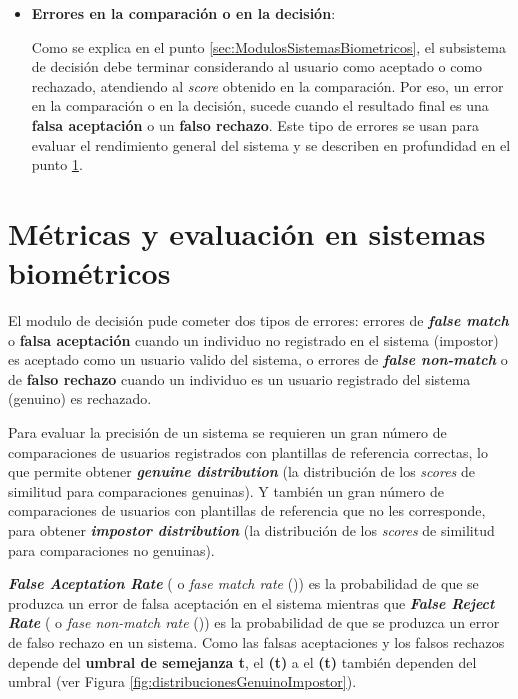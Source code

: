 \begin{itemize}
    \item 
    \textbf{Errores en la comparación o en la decisión}:
    
    Como se explica en el punto \ref{sec:ModulosSistemasBiometricos}, el subsistema de decisión debe terminar considerando al usuario como aceptado o como rechazado, atendiendo al \textit{score} obtenido en la comparación. Por eso, un error en la comparación o en la decisión, sucede cuando el resultado final es una \textbf{falsa aceptación} o un \textbf{falso rechazo}. Este tipo de errores se usan para evaluar el rendimiento general del sistema y se describen en profundidad en el punto \ref{sec:MetricasYEvaluacionSistemasbiometricos}.
\end{itemize}


\section{Métricas y evaluación en sistemas biométricos}\label{sec:MetricasYEvaluacionSistemasbiometricos}

El modulo de decisión pude cometer dos tipos de errores: errores de \textbf{\textit{false match}} o \textbf{falsa aceptación} cuando un individuo no registrado en el sistema (impostor) es aceptado como un usuario valido del sistema, o errores de \textbf{\textit{false non-match}} o de \textbf{falso rechazo} cuando un individuo es un usuario registrado del sistema (genuino) es rechazado.

Para evaluar la precisión de un sistema se requieren un gran número de comparaciones de usuarios registrados con plantillas de referencia correctas, lo que permite obtener \textbf{\textit{genuine distribution}} (la distribución de los \textit{scores} de similitud para comparaciones genuinas). Y también un gran número de comparaciones de usuarios con plantillas de referencia que no les corresponde, para obtener \textbf{\textit{impostor distribution}} (la distribución de los \textit{scores} de similitud para comparaciones no genuinas).  

\textbf{\textit{False Aceptation Rate}} (\textbf{} o \textit{fase match rate} ()) es la probabilidad de que se produzca un error de falsa aceptación en el sistema mientras que \textbf{\textit{False Reject Rate}} (\textbf{} o \textit{fase non-match rate} ()) es la probabilidad de que se produzca un error de falso rechazo en un sistema. Como las falsas aceptaciones y los falsos rechazos depende del \textbf{umbral de semejanza t}, el \textbf{(t)} a el \textbf{(t)} también dependen del umbral (ver Figura \ref{fig:distribucionesGenuinoImpostor}).

